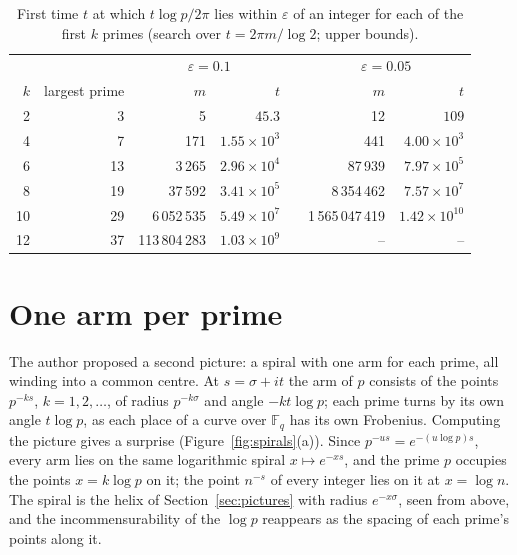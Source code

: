 \documentclass[11pt,a4paper]{article}
\theoremstyle{definition}\newtheorem{definition}[proposition]{Definition}
\theoremstyle{remark}\newtheorem{remark}[proposition]{Remark}
\begin{document}
\begin{table}[ht]\centering\small
\caption{First time $t$ at which $t\log p/2\pi$ lies within $\varepsilon$ of an integer for each of the first $k$ primes (search over $t=2\pi m/\log2$; upper bounds).}\label{tab:torus}
\begin{tabular}{rrrr@{\qquad}rrr}
\toprule
 & & \multicolumn{2}{c}{$\varepsilon=0.1$} & & \multicolumn{2}{c}{$\varepsilon=0.05$}\\
$k$ & largest prime & $m$ & $t$ & & $m$ & $t$\\
\midrule
2 & 3 & 5 & $45.3$ & & 12 & $109$\\
4 & 7 & 171 & $1.55\times10^{3}$ & & 441 & $4.00\times10^{3}$\\
6 & 13 & 3\,265 & $2.96\times10^{4}$ & & 87\,939 & $7.97\times10^{5}$\\
8 & 19 & 37\,592 & $3.41\times10^{5}$ & & 8\,354\,462 & $7.57\times10^{7}$\\
10 & 29 & 6\,052\,535 & $5.49\times10^{7}$ & & 1\,565\,047\,419 & $1.42\times10^{10}$\\
12 & 37 & 113\,804\,283 & $1.03\times10^{9}$ & & -- & --\\
\bottomrule
\end{tabular}
\end{table}

\section{One arm per prime}\label{sec:arms}
The author proposed a second picture: a spiral with one arm for each prime, all winding into a common centre. At $s=\sigma+it$ the arm of $p$ consists of the points $p^{-ks}$, $k=1,2,\dots$, of radius $p^{-k\sigma}$ and angle $-kt\log p$; each prime turns by its own angle $t\log p$, as each place of a curve over $\mathbb F_q$ has its own Frobenius. Computing the picture gives a surprise (Figure~\ref{fig:spirals}(a)). Since $p^{-us}=e^{-(u\log p)s}$, every arm lies on the same logarithmic spiral $x\mapsto e^{-xs}$, and the prime $p$ occupies the points $x=k\log p$ on it; the point $n^{-s}$ of every integer lies on it at $x=\log n$. The spiral is the helix of Section~\ref{sec:pictures} with radius $e^{-x\sigma}$, seen from above, and the incommensurability of the $\log p$ reappears as the spacing of each prime's points along it.
\end{document}
